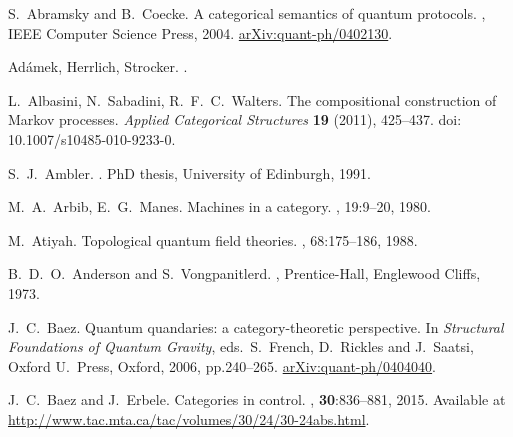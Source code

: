\begin{thebibliography}{RSW00}

    S.\ Abramsky and B.\ Coecke.
    \newblock A categorical semantics of quantum protocols.
    , IEEE Computer Science Press, 2004.
    \newblock \href{http://arxiv.org/abs/quant-ph/0402130}{arXiv:quant-ph/0402130}.

    Ad\'amek, Herrlich, Strocker. 
    .



    L.\ Albasini, N.\ Sabadini, R.\ F.\ C.\ Walters. 
    \newblock The compositional construction of Markov processes.
    \newblock \emph{Applied Categorical Structures} {\bf 19} (2011), 425--437. 
    \newblock doi: 10.1007/s10485-010-9233-0.

    S.\ J.\ Ambler. 
    . 
    \newblock PhD thesis, University of Edinburgh, 1991.

    M.\ A.\ Arbib, E.\ G.\ Manes. 
    \newblock Machines in a category.
    , 19:9--20, 1980.


     M.\ Atiyah. 
    \newblock Topological quantum field theories.
    , 68:175--186, 1988. 

    B.\ D.\ O.\ Anderson and S.\ Vongpanitlerd. 
    , Prentice-Hall, Englewood Cliffs, 1973.

    J.\ C.\ Baez. 
    \newblock Quantum quandaries: a category-theoretic
    perspective. 
    \newblock In {\sl Structural Foundations of Quantum Gravity}, eds.\
    S.\ French, D.\ Rickles and J.\ Saatsi, Oxford U.\ Press, Oxford,
    2006, pp.240--265. 
    \newblock \href{http://arxiv.org/abs/quant-ph/0404040}
    {arXiv:quant-ph/0404040}.

    J.\ C.\ Baez and J.\ Erbele.
    \newblock Categories in control. 
    , {\bf 30}:836--881,
    2015. 
    \newblock Available at
    \href{http://www.tac.mta.ca/tac/volumes/30/24/30-24abs.html}{http://www.tac.mta.ca/tac/volumes/30/24/30-24abs.html}.


\end{thebibliography}
